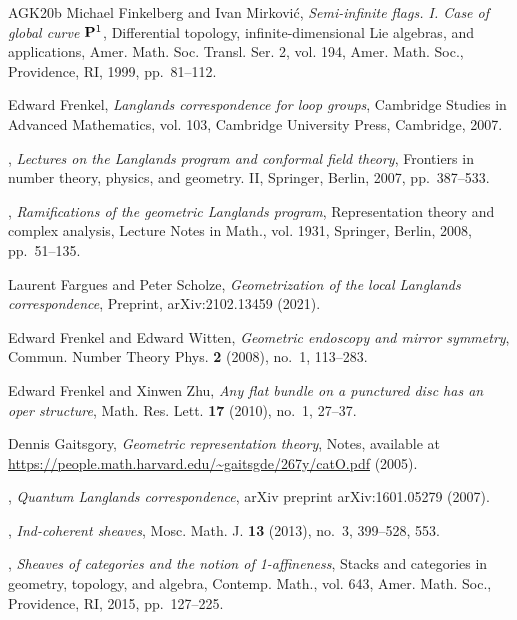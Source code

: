 \begin{thebibliography}{AGK{\etalchar{+}}20b}
Michael Finkelberg and Ivan Mirkovi\'{c}, \emph{Semi-infinite flags. {I}.
  {C}ase of global curve {$\bold P^1$}}, Differential topology,
  infinite-dimensional {L}ie algebras, and applications, Amer. Math. Soc.
  Transl. Ser. 2, vol. 194, Amer. Math. Soc., Providence, RI, 1999,
  pp.~81--112.

Edward Frenkel, \emph{Langlands correspondence for loop groups}, Cambridge
  Studies in Advanced Mathematics, vol. 103, Cambridge University Press,
  Cambridge, 2007.

\bysame, \emph{Lectures on the {L}anglands program and conformal field theory},
  Frontiers in number theory, physics, and geometry. {II}, Springer, Berlin,
  2007, pp.~387--533.

\bysame, \emph{Ramifications of the geometric {L}anglands program},
  Representation theory and complex analysis, Lecture Notes in Math., vol.
  1931, Springer, Berlin, 2008, pp.~51--135.

Laurent Fargues and Peter Scholze, \emph{Geometrization of the local
  {L}anglands correspondence}, Preprint, arXiv:2102.13459 (2021).

Edward Frenkel and Edward Witten, \emph{Geometric endoscopy and mirror
  symmetry}, Commun. Number Theory Phys. \textbf{2} (2008), no.~1, 113--283.

Edward Frenkel and Xinwen Zhu, \emph{Any flat bundle on a punctured disc has an
  oper structure}, Math. Res. Lett. \textbf{17} (2010), no.~1, 27--37.

Dennis Gaitsgory, \emph{Geometric representation theory}, Notes, available at
  \url{https://people.math.harvard.edu/~gaitsgde/267y/catO.pdf} (2005).

\bysame, \emph{Quantum {L}anglands correspondence}, arXiv preprint
  arXiv:1601.05279 (2007).

\bysame, \emph{{I}nd-coherent sheaves}, Mosc. Math. J. \textbf{13} (2013),
  no.~3, 399--528, 553.

\bysame, \emph{Sheaves of categories and the notion of 1-affineness}, Stacks
  and categories in geometry, topology, and algebra, Contemp. Math., vol. 643,
  Amer. Math. Soc., Providence, RI, 2015, pp.~127--225.


\end{thebibliography}
